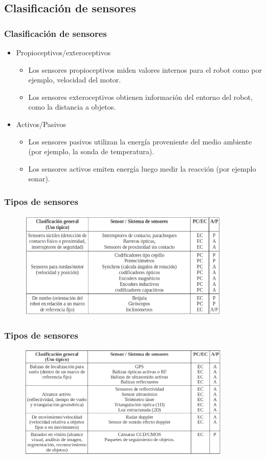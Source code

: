 \documentclass{beamer}
\begin{document}
\subsection{Clasificación de sensores}

\begin{frame}
\frametitle{Clasificación de sensores}
\begin{itemize}
\item Propioceptivos/exteroceptivos
\begin{itemize}
\item Los sensores propioceptivos miden valores internos para el robot como por ejemplo, velocidad del motor.
\item Los sensores exteroceptivos obtienen información del entorno del robot, como la distancia a objetos.
\end{itemize}
\item Activos/Pasivos
\begin{itemize}
\item Los sensores pasivos utilizan la energía proveniente del medio ambiente (por ejemplo, la sonda de temperatura).
\item Los sensores activos emiten energía luego medir la reacción (por ejemplo sonar).
\end{itemize}
\end{itemize}
\end{frame}

\begin{frame}
\frametitle{Tipos de sensores}
\begin{figure}[!h]
\centering
\includegraphics[width=4in]{tipo1}
\end{figure}
\end{frame}

\begin{frame}
\frametitle{Tipos de sensores}
\begin{figure}[!h]
\centering
\includegraphics[width=4in]{tipo2}
\end{figure}
\end{frame}
\end{document}

